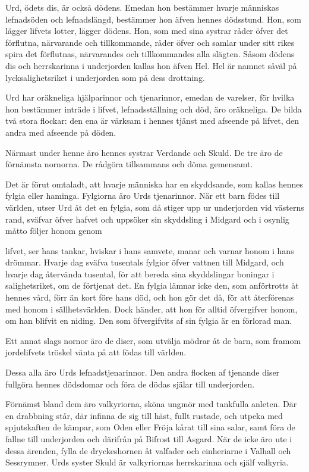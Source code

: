 

Urd, ödets dis, är också dödens. Emedan hon bestämmer hvarje människas
lefnadsöden och lefnadslängd, bestämmer hon äfven hennes dödsstund. Hon,
som lägger lifvets lotter, lägger dödens. Hon, som med sina systrar
råder öfver det förflutna, närvarande och tillkommande, råder öfver och
samlar under sitt rikes spira det förflutnas, närvarandes och
tillkommandes alla slägten. Såsom dödens dis och herrskarinna i
underjorden kallas hon äfven Hel. Hel är namnet såväl på
lycksalighetsriket i underjorden som på dess drottning.

Urd har oräkneliga hjälparinnor och tjenarinnor, emedan de varelser, för
hvilka hon bestämmer inträde i lifvet, lefnadsställning och död, äro
oräkneliga. De bilda två stora flockar: den ena är värksam i hennes
tjänst med afseende på lifvet, den andra med afseende på döden.

Närmast under henne äro hennes systrar Verdande och Skuld. De tre äro de
förnämsta nornorna. De rådgöra tillsammans och döma gemensamt.

Det är förut omtaladt, att hvarje människa har en skyddsande, som kallas
hennes fylgia eller haminga. Fylgiorna äro Urds tjenarinnor. När ett
barn födes till världen, utser Urd åt det en fylgia, som då stiger upp
ur underjorden vid västerns rand, sväfvar öfver hafvet och uppsöker sin
skyddsling i Midgard och i osynlig måtto följer honom genom

lifvet, ser hans tankar, hviskar i hans samvete, manar och varnar honom
i hans drömmar. Hvarje dag sväfva tusentals fylgior öfver vattnen till
Midgard, och hvarje dag återvända tusental, för att bereda sina
skyddslingar boningar i salighetsriket, om de förtjenat det. En fylgia
lämnar icke den, som anförtrotts åt hennes vård, förr än kort före hans
död, och hon gör det då, för att återförenas med honom i
sällhetsvärlden. Dock händer, att hon för alltid öfvergifver honom, om
han blifvit en niding. Den som öfvergifvits af sin fylgia är en förlorad
man.

Ett annat slags nornor äro de diser, som utvälja mödrar åt de barn, som
framom jordelifvets tröskel vänta på att födas till världen.

Dessa alla äro Urds lefnadstjenarinnor. Den andra flocken af tjenande
diser fullgöra hennes dödsdomar och föra de dödas själar till
underjorden.

Förnämst bland dem äro valkyriorna, sköna ungmör med tankfulla anleten.
Där en drabbning står, där infinna de sig till häst, fullt rustade, och
utpeka med spjutskaften de kämpar, som Oden eller Fröja kårat till sina
salar, samt föra de fallne till underjorden och därifrån på Bifrost till
Asgard. När de icke äro ute i dessa ärenden, fylla de dryckeshornen åt
valfader och einheriarne i Valhall och Sessrymner. Urds syster Skuld är
valkyriornas herrskarinna och själf valkyria.

